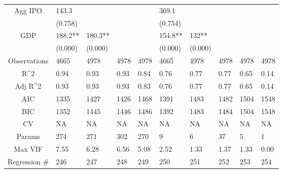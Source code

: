 \documentclass{article}
\begin{document}
\begin{table}[H]
\begin{tabular}{|clllllllll|}
  Agg IPO & 143.3 &  &  &  & 369.1 &  &  &  &  \\
   & (0.758) &  &  &  & (0.754) &  &  &  &  \\
  GDP & 188.2** & 180.3** &  &  & 154.8** & 132** &  &  &  \\
   & (0.000) & (0.000) &  &  & (0.000) & (0.000) &  &  &  \\
  \hline
 Observations & 4665 & 4978 & 4978 & 4978 & 4665 & 4978 & 4978 & 4978 & 4978 \\
  R^2 & 0.94 & 0.93 & 0.93 & 0.84 & 0.76 & 0.77 & 0.77 & 0.65 & 0.14 \\
  Adj R^2 & 0.93 & 0.93 & 0.93 & 0.83 & 0.76 & 0.77 & 0.77 & 0.65 & 0.14 \\
  AIC & 1335 & 1427 & 1426 & 1468 & 1391 & 1483 & 1482 & 1504 & 1548 \\
  BIC & 1352 & 1445 & 1446 & 1486 & 1392 & 1483 & 1484 & 1504 & 1548 \\
  CV & NA & NA & NA & NA & NA & NA & NA & NA & NA \\
  Params & 274 & 271 & 302 & 270 & 9 & 6 & 37 & 5 & 1 \\
  Max VIF & 7.55 & 6.28 & 6.56 & 5.08 & 2.52 & 1.33 & 1.37 & 1.33 & 0.00 \\
  Regression \# & 246 & 247 & 248 & 249 & 250 & 251 & 252 & 253 & 254 \\
   \hline
\end{tabular}

\end{table}
\end{document}
